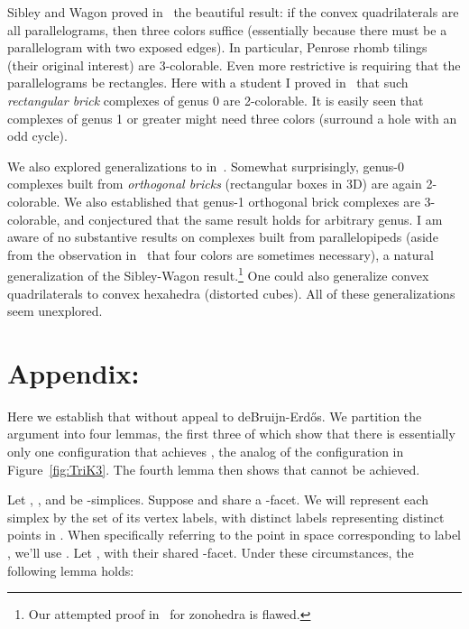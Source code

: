 \pdfoutput=1  \documentclass[]{article}
\newcommand{\seclab}[1]{\label{sec:#1}}
\newcommand{\figref}[1]{\ref{fig:#1}}
\begin{document}
Sibley and Wagon proved in~\cite{sw-rpt3c-00}
the beautiful result: if the convex quadrilaterals are all parallelograms,
then three colors suffice
(essentially because there must be a parallelogram with two exposed edges).
In particular, Penrose rhomb tilings (their original interest) are 3-colorable.
Even more restrictive is requiring that the parallelograms be
rectangles.  Here with a student I proved  in~\cite{go-cobb-03} that such
\emph{rectangular brick} complexes of genus 0 are 2-colorable.
It is easily seen that complexes of genus 1 or greater might need
three colors (surround a hole with an odd cycle).


We also explored generalizations to  in~\cite{go-cobb-03}.
Somewhat surprisingly, genus-0 complexes built from \emph{orthogonal
bricks} (rectangular boxes in 3D) are again 2-colorable.
We also established that genus-1 orthogonal brick complexes are
3-colorable,
and conjectured that the same result holds for arbitrary genus.
I am aware of no substantive results on complexes built from
parallelopipeds (aside from the observation in~\cite{go-cobb-03} that
four colors are sometimes necessary), 
a natural generalization of the Sibley-Wagon result.\footnote{
  Our attempted proof in~\cite{go-cobb-03} for zonohedra is flawed.
}
One could also generalize convex quadrilaterals to convex hexahedra
(distorted cubes).
All of these generalizations seem unexplored.


\section{Appendix: }
\seclab{Kd2}
Here we establish that  without appeal
to deBruijn-Erd\H{o}s.
We partition the argument into four lemmas, the first three of which
show that there is essentially only one configuration that
achieves , the analog of the configuration in
Figure~\figref{TriK3}.
The fourth lemma then shows that  cannot be achieved.

Let , , and  be -simplices.
Suppose  and  share a -facet.
We will represent each simplex by the set of its vertex labels,
with distinct labels representing distinct points in .
When specifically referring to the point in space corresponding
to label , we'll use .
Let 
,
with  their shared -facet.
Under these circumstances, the following lemma holds:
\end{document}
